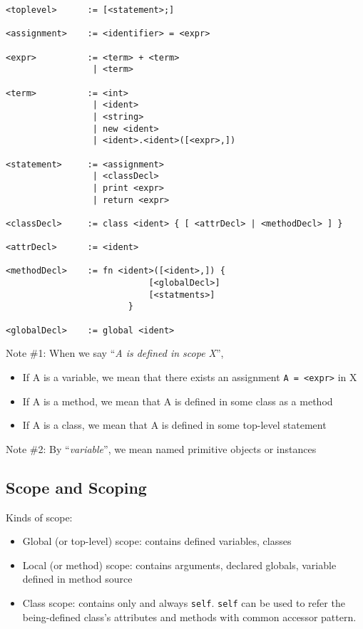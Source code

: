 \documentclass[]{article}
\numberwithin{equation}{section}
\numberwithin{figure}{section}
\numberwithin{table}{section}
\begin{document}
\begin{verbatim}
<toplevel>      := [<statement>;]

<assignment>    := <identifier> = <expr>

<expr>          := <term> + <term>
                 | <term>

<term>          := <int>
                 | <ident>
                 | <string>
                 | new <ident>
                 | <ident>.<ident>([<expr>,])

<statement>     := <assignment>
                 | <classDecl>
                 | print <expr>
                 | return <expr>

<classDecl>     := class <ident> { [ <attrDecl> | <methodDecl> ] }

<attrDecl>      := <ident>

<methodDecl>    := fn <ident>([<ident>,]) {
                            [<globalDecl>]
                            [<statments>]
                        }

<globalDecl>    := global <ident>
\end{verbatim}

Note \#1: When we say ``\emph{A is defined in scope X}'',

\begin{itemize}
\itemsep1pt\parskip0pt
\item
  If A is a variable, we mean that there exists an assignment
  \texttt{A = \textless{}expr\textgreater{}} in X
\item
  If A is a method, we mean that A is defined in some class as a method
\item
  If A is a class, we mean that A is defined in some top-level
  statement
\end{itemize}

Note \#2: By ``\emph{variable}'', we mean named primitive objects or
instances

\subsection{Scope and Scoping}\label{scope-and-scoping}

Kinds of scope:

\begin{itemize}
\itemsep1pt\parskip0pt
\item
  Global (or top-level) scope: contains defined variables, classes
\item
  Local (or method) scope: contains arguments, declared globals,
  variable defined in method source
\item
  Class scope: contains only and always \texttt{self}. \texttt{self} can be used
  to refer the being-defined class's attributes and methods with common accessor
  pattern.
\end{itemize}
\end{document}
